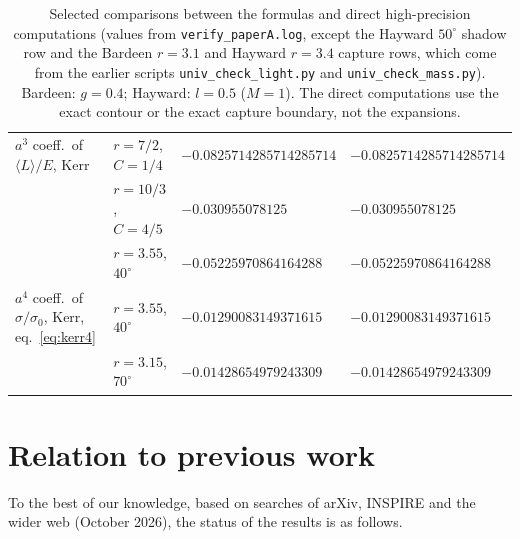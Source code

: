\documentclass[11pt,a4paper]{article}
\theoremstyle{remark}
\numberwithin{equation}{section}
\begin{document}
\begin{table}[ht]
{\begin{tabular}{llll}
$a^3$ coeff.\ of $\langle L\rangle/E$, Kerr & $r=7/2$, $C=1/4$ & $-0.0825714285714285714$ & $-0.0825714285714285714$\\
 & $r=10/3$, $C=4/5$ & $-0.030955078125$ & $-0.030955078125$\\
 & $r=3.55$, $40^\circ$ & $-0.05225970864164288$ & $-0.05225970864164288$\\
$a^4$ coeff.\ of $\sigma/\sigma_0$, Kerr, eq.~\eqref{eq:kerr4} & $r=3.55$, $40^\circ$ & $-0.01290083149371615$ & $-0.01290083149371615$\\
 & $r=3.15$, $70^\circ$ & $-0.01428654979243309$ & $-0.01428654979243309$\\
\bottomrule
\end{tabular}}
\caption{Selected comparisons between the formulas and direct high-precision computations (values from
\texttt{verify\_paperA.log}, except the Hayward $50^\circ$ shadow row and the Bardeen $r=3.1$ and Hayward $r=3.4$ capture rows,
which come from the earlier scripts \texttt{univ\_check\_light.py} and \texttt{univ\_check\_mass.py}).
Bardeen: $g=0.4$; Hayward: $l=0.5$ ($M=1$). The direct computations use the exact contour or
the exact capture boundary, not the expansions.}
\label{tab:checks}
\end{table}

\section{Relation to previous work}\label{sec:prior}
To the best of our knowledge, based on searches of arXiv, INSPIRE and the wider web (October 2026), the
status of the results is as follows.
\end{document}
